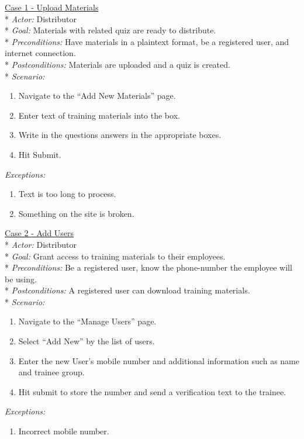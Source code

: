 \underline{Case 1 - Upload Materials}\\*
\textit{Actor:} Distributor\\*
\textit{Goal:} Materials with related quiz are ready to distribute.\\*
\textit{Preconditions:} Have materials in a plaintext format, be a registered user, and internet connection.\\*
\textit{Postconditions:} Materials are uploaded and a quiz is created.\\*
\textit{Scenario:}
\begin{enumerate}
	\item{Navigate to the “Add New Materials” page.}
	\item{Enter text of training materials into the box.}
	\item{Write in the questions answers in the appropriate boxes.}
	\item{Hit Submit.}
\end{enumerate}
\textit{Exceptions:}
\begin{enumerate}
	\item{Text is too long to process.}
	\item{Something on the site is broken.}\\
\end{enumerate}

\underline{Case 2 - Add Users}\\*
\textit{Actor:} Distributor\\*
\textit{Goal:} Grant access to training materials to their employees.\\*
\textit{Preconditions:} Be a registered user, know the phone-number the employee will be using.\\*
\textit{Postconditions:} A registered user can download training materials.\\*
\textit{Scenario:}
\begin{enumerate}
	\item{Navigate to the “Manage Users” page.}
	\item{Select “Add New” by the list of users.}
	\item{Enter the new User’s mobile number and additional information such as name and trainee group.}
	\item{Hit submit to store the number and send a verification text to the trainee.}
\end{enumerate}
\textit{Exceptions:}
\begin{enumerate}
	\item{Incorrect mobile number.}\\
\end{enumerate}

